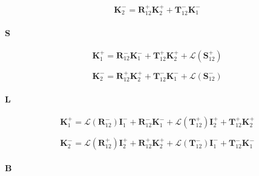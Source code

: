 \begin{equation}
\mathbf{K}^{-}_{2} = \mathbf{R}^{+}_{12}\mathbf{K}^{+}_{2} + \mathbf{T}^{-}_{12}\mathbf{K}^{-}_{1}
\label{eq:radiance-slab_radiance-tangent_linear-b_K_m_tau}
\end{equation}


\paragraph{S}
\label{sec:radiance-boa_radiance-tangent_linear-s}

\begin{equation}
\mathbf{K}^{+}_{1} = \mathbf{R}^{-}_{12}\mathbf{K}^{-}_{1} + \mathbf{T}^{+}_{12}\mathbf{K}^{+}_{2} + \mathcal{L}(\mathbf{S}^{+}_{12})
\label{eq:radiance-slab_radiance-tangent_linear-s_K_p_0}
\end{equation}

\begin{equation}
\mathbf{K}^{-}_{2} = \mathbf{R}^{+}_{12}\mathbf{K}^{+}_{2} + \mathbf{T}^{-}_{12}\mathbf{K}^{-}_{1} + \mathcal{L}(\mathbf{S}^{-}_{12})
\label{eq:radiance-slab_radiance-tangent_linear-s_K_m_tau}
\end{equation}


\paragraph{L}
\label{sec:radiance-boa_radiance-tangent_linear-l}

\begin{equation}
\mathbf{K}^{+}_{1} = \mathcal{L}(\mathbf{R}^{-}_{12})\mathbf{I}^{-}_{1} + \mathbf{R}^{-}_{12}\mathbf{K}^{-}_{1} + \mathcal{L}(\mathbf{T}^{+}_{12})\mathbf{I}^{+}_{2} + \mathbf{T}^{+}_{12}\mathbf{K}^{+}_{2}
\label{eq:radiance-slab_radiance-tangent_linear-l_K_p_0}
\end{equation}

\begin{equation}
\mathbf{K}^{-}_{2} = \mathcal{L}(\mathbf{R}^{+}_{12})\mathbf{I}^{+}_{2} + \mathbf{R}^{+}_{12}\mathbf{K}^{+}_{2} + \mathcal{L}(\mathbf{T}^{-}_{12})\mathbf{I}^{-}_{1} + \mathbf{T}^{-}_{12}\mathbf{K}^{-}_{1}
\label{eq:radiance-slab_radiance-tangent_linear-l_K_m_tau}
\end{equation}


\paragraph{B}
\label{sec:radiance-boa_radiance-tangent_linear-b}

